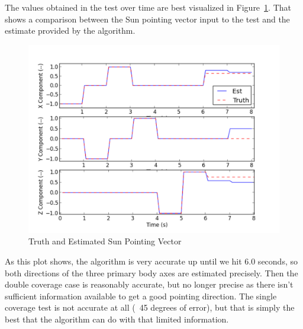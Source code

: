 \documentclass[]{LASPreport}
\begin{document}
The values obtained in the test over time are best visualized in 
Figure~\ref{fig:point_fig}.  That shows a comparison between the Sun pointing 
vector input to the test and the estimate provided by the algorithm.
\begin{figure}[htb]
        \centerline{
        \includegraphics[scale=0.5]{Figures/sunEstAccuracy}
        }
        \caption{Truth and Estimated Sun Pointing Vector}
        \label{fig:point_fig}
\end{figure}

As this plot shows, the algorithm is very accurate up until we hit 6.0 seconds, 
so both directions of the three primary body axes are estimated precisely.  
Then the double coverage case is reasonably accurate, but no longer precise as 
there isn't sufficient information available to get a good pointing direction.  
The single coverage test is not accurate at all (~45 degrees of error), but that 
is simply the best that the algorithm can do with that limited information.
\end{document}
